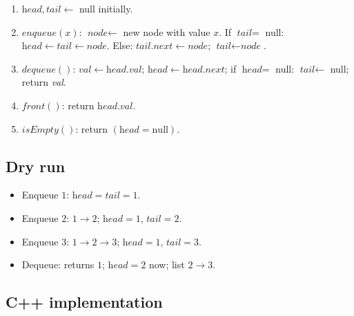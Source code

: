 \begin{enumerate}
  \item $\textit{head}, \textit{tail} \gets$ null initially.
  \item $\textit{enqueue}(x)$: $\textit{node} \gets$ new node with value
        $x$. If $\textit{tail} = $ null: $\textit{head} \gets
        \textit{tail} \gets \textit{node}$. Else:
        $\textit{tail}.\textit{next} \gets \textit{node}$;
        $\textit{tail} \gets \textit{node}$.
  \item $\textit{dequeue}()$: $\textit{val} \gets
        \textit{head}.\textit{val}$; $\textit{head} \gets
        \textit{head}.\textit{next}$; if $\textit{head} = $ null:
        $\textit{tail} \gets$ null; return \textit{val}.
  \item $\textit{front}()$: return $\textit{head}.\textit{val}$.
  \item $\textit{isEmpty}()$: return $(\textit{head} = \text{null})$.
\end{enumerate}

\subsection*{Dry run}


\begin{itemize}
  \item Enqueue $1$: $\textit{head}=\textit{tail}=1$.
  \item Enqueue $2$: $1 \to 2$; $\textit{head}=1$, $\textit{tail}=2$.
  \item Enqueue $3$: $1\to2\to3$; $\textit{head}=1$, $\textit{tail}=3$.
  \item Dequeue: returns $1$; $\textit{head}=2$ now; list $2\to3$.
\end{itemize}

\subsection*{C++ implementation}

